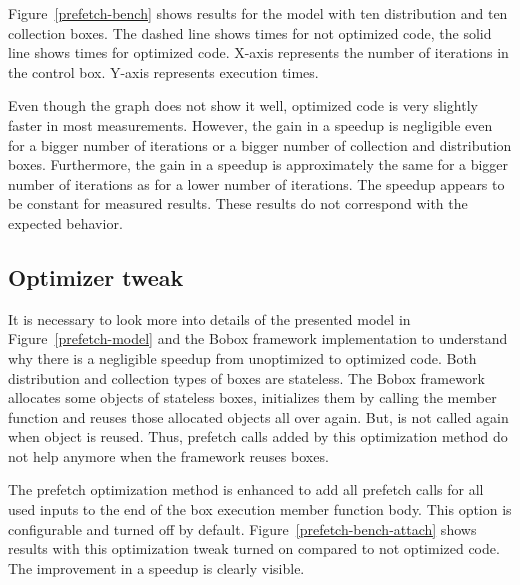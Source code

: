 Figure~\ref{prefetch-bench} shows results for the model with ten distribution and ten collection boxes. The dashed line shows times for not optimized code, the solid line shows times for  optimized code. X-axis represents the number of iterations in the control box. Y-axis represents execution times.

Even though the graph does not show it well, optimized code is very slightly faster in  most measurements. However, the gain in a speedup is negligible even for a bigger number of iterations or a bigger number of collection and distribution boxes. Furthermore, the gain in a speedup is approximately the same for a bigger number of iterations as for a lower number of iterations. The speedup appears to be constant for measured results. These results do not correspond with the expected behavior.

\subsection{Optimizer tweak}
It is necessary to look more into details of the presented model in Figure~\ref{prefetch-model} and the Bobox framework implementation to understand why there is a negligible speedup from unoptimized to optimized code. Both distribution and collection types of boxes are stateless. The Bobox framework allocates some objects of stateless boxes, initializes them by calling the  member function and reuses those allocated objects all over again. But,  is not called again when object is reused. Thus, prefetch calls added by this optimization method do not help anymore when the framework reuses boxes.

The prefetch optimization method is enhanced to add all prefetch calls for all used inputs to the end of the box execution member function body. This option is configurable and turned off by default. Figure~\ref{prefetch-bench-attach} shows results with this optimization tweak turned on compared to not optimized code. The improvement in a speedup is clearly visible.

